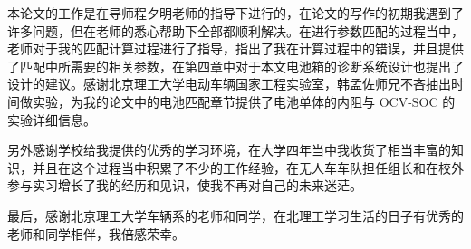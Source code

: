 
\begin{thanks}

本论文的工作是在导师程夕明老师的指导下进行的，在论文的写作的初期我遇到了许多问题，但在老师的悉心帮助下全部都顺利解决。在进行参数匹配的过程当中，老师对于我的匹配计算过程进行了指导，指出了我在计算过程中的错误，并且提供了匹配中所需要的相关参数，在第四章中对于本文电池箱的诊断系统设计也提出了设计的建议。感谢北京理工大学电动车辆国家工程实验室，韩孟佐师兄不吝抽出时间做实验，为我的论文中的电池匹配章节提供了电池单体的内阻与 OCV-SOC 的实验详细信息。

另外感谢学校给我提供的优秀的学习环境，在大学四年当中我收货了相当丰富的知识，并且在这个过程当中积累了不少的工作经验，在无人车车队担任组长和在校外参与实习增长了我的经历和见识，使我不再对自己的未来迷茫。

最后，感谢北京理工大学车辆系的老师和同学，在北理工学习生活的日子有优秀的老师和同学相伴，我倍感荣幸。
\end{thanks}
